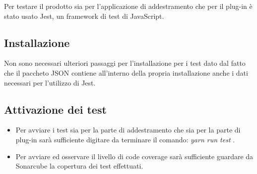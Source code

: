 \documentclass[../manuale-sviluppatore.tex]{subfiles}
\begin{document}
    Per testare il prodotto sia per l'applicazione di addestramento che per il plug-in è stato usato Jest, un framework di test di JavaScript.
    
    \subsection{Installazione}%
    \label{subs:installazione}
    Non sono necessari ulteriori passaggi per l'installazione per i test dato dal fatto che il paccheto JSON contiene all'interno della propria installazione anche i dati necessari per l'utilizzo di Jest. 

    \subsection{Attivazione dei test}%
    \label{subs:attivazione-dei-test}
    \begin{itemize}
    \item Per avviare i test sia per la parte  di addestramento che sia per la parte di plug-in sarà sufficiente digitare da terminare il comando: \emph{yarn run test} .
    \item Per avviare ed osservare il livello di code coverage sarà sufficiente guardare da Sonarcube la copertura dei test effettuati.
    \end{itemize}
\end{document}
